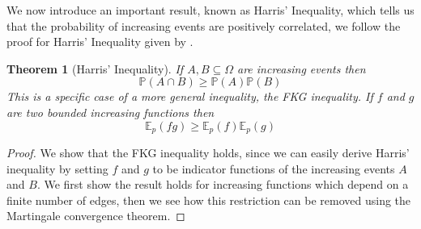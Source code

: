 \documentclass[a4paper,11pt]{article}
\newtheorem{theorem}{Theorem}[section]
\theoremstyle{definition}
\newcommand{\prob}{\mathbb{P}_p}
\begin{document}
We now introduce an important result, known as Harris' Inequality, which tells us that the probability of increasing events are positively correlated, we follow the proof for Harris' Inequality given by \cite{duminil2018introduction}.
\begin{theorem}[Harris' Inequality] \label{harrisLemma}
If $A, B \subseteq \Omega$ are increasing events then 
$$\mathbb{P}(A \cap B) \geq \mathbb{P}(A)\mathbb{P}(B)$$
This is a specific case of a more general inequality, the FKG inequality.
If $f$ and $g$ are two bounded increasing functions then
$$ \mathbb{E}_p(fg) \geq \mathbb{E}_p(f)\mathbb{E}_p(g)$$
\end{theorem}
\begin{proof}
	
	
	

	We show that the FKG inequality holds, since we can easily derive Harris' inequality by setting $f$ and $g$ to be indicator functions of the increasing events $A$ and $B$.
	We first show the result holds for increasing functions which depend on a finite number of edges, then we see how this restriction can be removed using the Martingale convergence theorem.



\end{proof}
\end{document}
